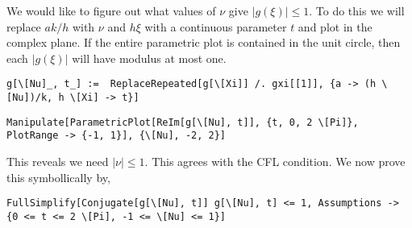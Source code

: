 \documentclass[12pt]{article}
\begin{document}
We would like to figure out what values of \( \nu \) give \( |g(\xi)|\leq 1 \). To do this we will replace \( ak/h \) with \( \nu \) and \( h\xi \) with a continuous parameter \( t \) and plot in the complex plane. If the entire parametric plot is contained in the unit circle, then each \( |g(\xi)| \) will have modulus at most one.
\begin{lstlisting}
g[\[Nu]_, t_] :=  ReplaceRepeated[g[\[Xi]] /. gxi[[1]], {a -> (h \[Nu])/k, h \[Xi] -> t}]
\end{lstlisting}

\begin{lstlisting}
Manipulate[ParametricPlot[ReIm[g[\[Nu], t]], {t, 0, 2 \[Pi]}, PlotRange -> {-1, 1}], {\[Nu], -2, 2}]
\end{lstlisting}

This reveals we need \( |\nu| \leq 1 \). This agrees with the CFL condition. We now prove this symbollically by,
\begin{lstlisting}
FullSimplify[Conjugate[g[\[Nu], t]] g[\[Nu], t] <= 1, Assumptions -> {0 <= t <= 2 \[Pi], -1 <= \[Nu] <= 1}]
\end{lstlisting}
\end{document}
